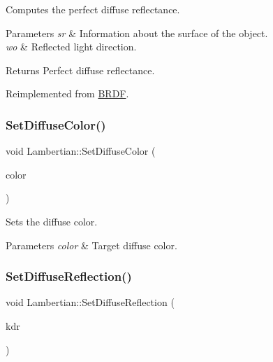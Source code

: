Computes the perfect diffuse reflectance. 
\begin{DoxyParams}{Parameters}
{\em sr} & Information about the surface of the object. \\
\hline
{\em wo} & Reflected light direction. \\
\hline
\end{DoxyParams}
\begin{DoxyReturn}{Returns}
Perfect diffuse reflectance. 
\end{DoxyReturn}


Reimplemented from \hyperlink{class_b_r_d_f_a676438154e142c5762193ee5251e4d57}{B\+R\+DF}.

\hypertarget{group___b_r_d_f_gadd1e0590ffcada37b485b985182439de}{}\label{group___b_r_d_f_gadd1e0590ffcada37b485b985182439de} 
\subsubsection{\texorpdfstring{Set\+Diffuse\+Color()}{SetDiffuseColor()}}
{\footnotesize\ttfamily void Lambertian\+::\+Set\+Diffuse\+Color (\begin{DoxyParamCaption}\item[{const \hyperlink{class_r_g_b_color}{R\+G\+B\+Color} \&}]{color }\end{DoxyParamCaption})\hspace{0.3cm}{\ttfamily [inline]}}

Sets the diffuse color. 
\begin{DoxyParams}{Parameters}
{\em color} & Target diffuse color. \\
\hline
\end{DoxyParams}
\hypertarget{group___b_r_d_f_ga4d1bf71e27d8eacc273d244e01fe2d46}{}\label{group___b_r_d_f_ga4d1bf71e27d8eacc273d244e01fe2d46} 
\subsubsection{\texorpdfstring{Set\+Diffuse\+Reflection()}{SetDiffuseReflection()}}
{\footnotesize\ttfamily void Lambertian\+::\+Set\+Diffuse\+Reflection (\begin{DoxyParamCaption}\item[{const float}]{kdr }\end{DoxyParamCaption})\hspace{0.3cm}{\ttfamily [inline]}}

